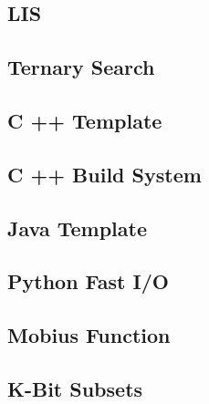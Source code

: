 \documentclass[12pt]{extarticle}
\begin{document}
\begin{multicols*}{2}
\subsection{LIS} %


\subsection{Ternary Search} %


\subsection{C ++ Template} %


\subsection{C ++ Build System} %


% 

\subsection{Java Template} %


\subsection{Python Fast I/O} %


\subsection{Mobius Function} %


\subsection{K-Bit Subsets} %




\end{multicols*}
\end{document}
